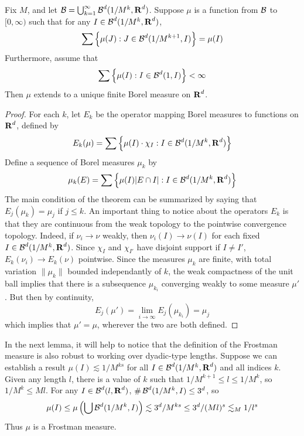 \begin{lemma}
	Fix $M$, and let $\operatorname{\mathcal{B}} = \bigcup_{k = 1}^\infty \operatorname{\mathcal{B}}^d(1/M^k,\operatorname{\mathbf{R}}^d)$. Suppose $\mu$ is a function from $\operatorname{\mathcal{B}}$ to $[0,\infty)$ such that for any $I \in \operatorname{\mathcal{B}}^d(1/M^k,\operatorname{\mathbf{R}}^d)$,
	\[ \sum \left\{ \mu(J) :J \in \operatorname{\mathcal{B}}^d(1/M^{k+1},I) \right\} = \mu(I) \]
	Furthermore, assume that
	\[ \sum \left\{ \mu(I) : I \in \operatorname{\mathcal{B}}^d(1,I)  \right\} < \infty \]
	Then $\mu$ extends to a unique finite Borel measure on $\operatorname{\mathbf{R}}^d$.
\end{lemma}
\begin{proof}
	For each $k$, let $E_k$ be the operator mapping Borel measures to functions on $\operatorname{\mathbf{R}}^d$, defined by
	\[ E_k(\mu) = \sum \left\{ \mu(I) \cdot \chi_I : I \in \operatorname{\mathcal{B}}^d(1/M^k,\operatorname{\mathbf{R}}^d) \right\} \]
	Define a sequence of Borel measures $\mu_k$ by
	\[ \mu_k(E) = \sum \left\{ \mu(I) |E \cap I| : I \in \operatorname{\mathcal{B}}^d(1/M^k,\operatorname{\mathbf{R}}^d) \right\} \]
	The main condition of the theorem can be summarized by saying that $E_j(\mu_k) = \mu_j$ if $j \leq k$. An important thing to notice about the operators $E_k$ is that they are continuous from the weak topology to the pointwise convergence topology. Indeed, if $\nu_i \to \nu$ weakly, then $\nu_i(I) \to \nu(I)$ for each fixed $I \in \operatorname{\mathcal{B}}^d(1/M^k,\operatorname{\mathbf{R}}^d)$. Since $\chi_I$ and $\chi_{I'}$ have disjoint support if $I \neq I'$, $E_k(\nu_i) \to E_k(\nu)$ pointwise. Since the measures $\mu_k$ are finite, with total variation $\| \mu_k \|$ bounded independantly of $k$, the weak compactness of the unit ball implies that there is a subsequence $\mu_{k_i}$ converging weakly to some measure $\mu'$. But then by continuity,
	\[ E_j(\mu') = \lim_{i \to \infty} E_j(\mu_{k_i}) = \mu_j \]
	which implies that $\mu' = \mu$, wherever the two are both defined.
\end{proof}

In the next lemma, it will help to notice that the definition of the Frostman measure is also robust to working over dyadic-type lengths. Suppose we can establish a result $\mu(I) \lesssim 1/M^{ks}$ for all $I \in \operatorname{\mathcal{B}}^d(1/M^k,\operatorname{\mathbf{R}}^d)$ and all indices $k$. Given any length $l$, there is a value of $k$ such that $1/M^{k+1} \leq l \leq 1/M^k$, so $1/M^k \leq Ml$. For any $I \in \operatorname{\mathcal{B}}^d(l,\operatorname{\mathbf{R}}^d)$, $\# \operatorname{\mathcal{B}}^d(1/M^k,I) \leq 3^d$, so
%
\[ \mu(I) \leq \mu \left(\bigcup \operatorname{\mathcal{B}}^d(1/M^k,I) \right) \lesssim 3^d/M^{ks} \leq 3^d/(Ml)^s \lesssim_M 1/l^s \]
%
Thus $\mu$ is a Frostman measure.

